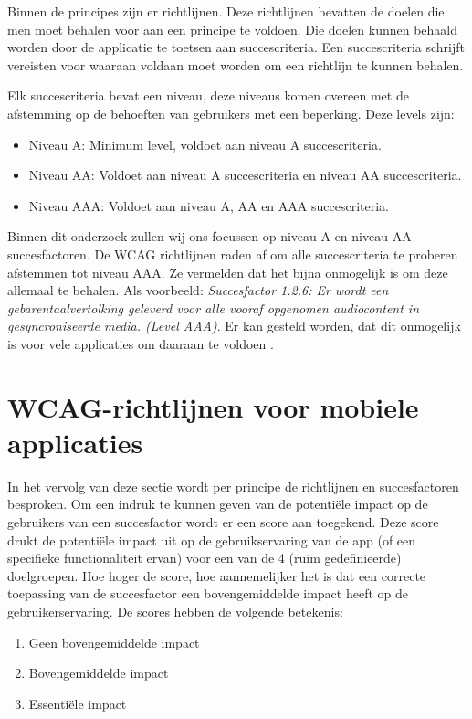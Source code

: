Binnen de principes zijn er richtlijnen. Deze richtlijnen bevatten de doelen die men moet behalen voor aan een principe te voldoen. Die doelen kunnen behaald worden door de applicatie te toetsen aan succescriteria. Een succescriteria schrijft vereisten voor waaraan voldaan moet worden om een richtlijn te kunnen behalen. 

Elk succescriteria bevat een niveau, deze niveaus komen overeen met de afstemming op de behoeften van gebruikers met een beperking. Deze levels zijn:
\begin{itemize}
    \item Niveau A: Minimum level, voldoet aan niveau A succescriteria.
    \item Niveau AA: Voldoet aan niveau A succescriteria en niveau AA succescriteria.
    \item Niveau AAA: Voldoet aan niveau A, AA en AAA succescriteria.
\end{itemize}

Binnen dit onderzoek zullen wij ons focussen op niveau A en niveau AA succesfactoren. De WCAG richtlijnen raden af om alle succescriteria te proberen afstemmen tot niveau AAA. Ze vermelden dat het bijna onmogelijk is om deze allemaal te behalen. Als voorbeeld:  \emph{Succesfactor 1.2.6: Er wordt een gebarentaalvertolking geleverd voor alle vooraf opgenomen audiocontent in gesyncroniseerde media. (Level AAA)}. Er kan gesteld worden, dat dit onmogelijk is voor vele applicaties om daaraan te voldoen \autocite{WCAG2.1Criteria}.

\section{WCAG-richtlijnen voor mobiele applicaties}
\label{sec:WCAGrichtlijnMobiel}
In het vervolg van deze sectie wordt per principe de richtlijnen en succesfactoren besproken. Om een indruk te kunnen geven van de potentiële impact op de gebruikers van een succesfactor wordt er een score aan toegekend. Deze score drukt de potentiële impact uit op de gebruikservaring van de app (of een specifieke functionaliteit ervan) voor een van de 4 (ruim gedefinieerde) doelgroepen.
Hoe hoger de score, hoe aannemelijker het is dat een correcte toepassing van de succesfactor een bovengemiddelde impact heeft op de gebruikerservaring. De scores hebben de volgende betekenis:
\begin{enumerate}
    \item Geen bovengemiddelde impact
    \item Bovengemiddelde impact
    \item Essentiële impact
\end{enumerate}

